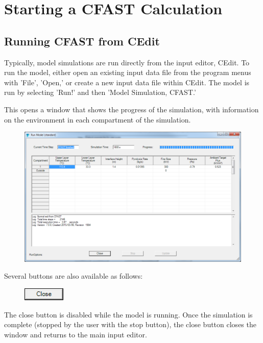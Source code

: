 \section{Starting a CFAST Calculation}

\subsection{Running CFAST from CEdit}

Typically, model simulations are run directly from the input editor, CEdit.  To run the model, either open an existing input data file from the program menus with 'File', 'Open,' or create a new input data file within CEdit.  The model is run by selecting 'Run!' and then 'Model Simulation, CFAST.'

This opens a window that shows the progress of the simulation, with information on the environment in each compartment of the simulation.

\begin{figure}[h!]
\begin{center}
\includegraphics[width=6.5in]{FIGURES/Running_CFAST/Standard_Output}
\end{center}
\end{figure}

Several buttons are also available as follows:

\begin{figure}
  \includegraphics[width=0.79in]{FIGURES/Running_CFAST/Close_Button}
\end{figure}

The close button is disabled while the model is running.  Once the simulation is complete (stopped by the user with the stop button), the close button closes the window and returns to the main input editor. \\

